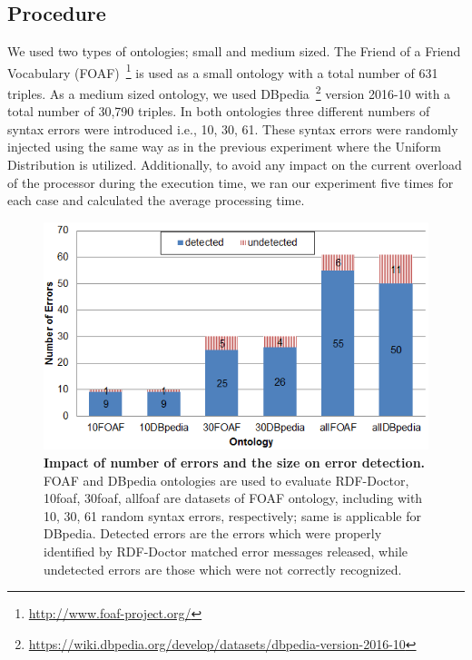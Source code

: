 \subsection{Procedure}

We used two types of ontologies; small and medium sized. 
The Friend of a Friend Vocabulary (FOAF)~\footnote{\url{http://www.foaf-project.org/}} is used as a small ontology with a total number of 631 triples. 
As a medium sized ontology, we used DBpedia~\footnote{\url{https://wiki.dbpedia.org/develop/datasets/dbpedia-version-2016-10}} version 2016-10 with a total number of 30,790 triples. 
In both ontologies three different numbers of syntax errors were introduced i.e., 10, 30, 61. These syntax errors were randomly injected using  the same way as in the previous experiment where the Uniform Distribution is utilized.
Additionally, to avoid any impact on the current overload of the processor during the execution time, we ran our experiment five times for each case and calculated the average processing time.

 \begin{figure}[ht]
\begin{center}
		\includegraphics[scale=0.9,angle=0]{images/Experiment03-01.png}
		\vspace*{-4mm}
		\caption{\textbf{Impact of number of errors and the size on error detection.} 
		FOAF and DBpedia ontologies are used to evaluate RDF-Doctor, 10foaf, 30foaf, allfoaf are datasets of FOAF ontology, including with 10, 30, 61 random syntax errors, respectively; same is applicable for DBpedia. Detected errors are the errors which were properly identified by RDF-Doctor matched error messages  released, while undetected errors are those which were not correctly recognized.}
		\label{Fig:Experiment03-01}
\end{center}
\end{figure}
